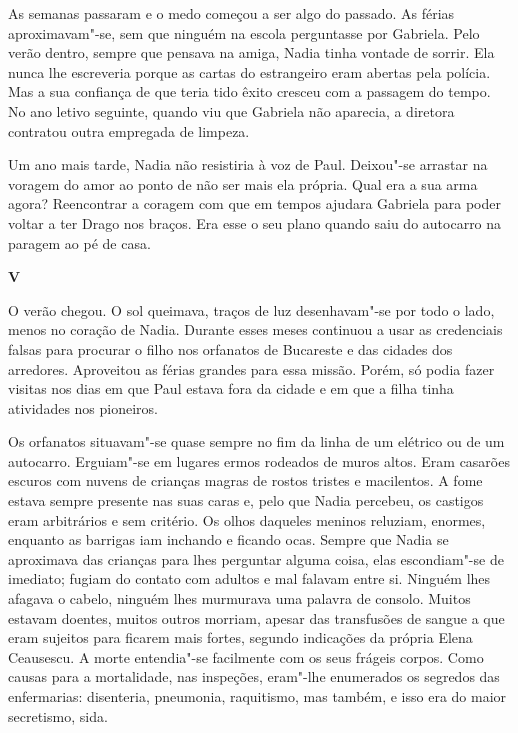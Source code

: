 As semanas passaram e o medo começou a ser algo do passado. As férias
aproximavam"-se, sem que ninguém na escola perguntasse por Gabriela. Pelo
verão dentro, sempre que pensava na amiga, Nadia tinha vontade de
sorrir. Ela nunca lhe escreveria porque as cartas do estrangeiro eram
abertas pela polícia. Mas a sua confiança de que teria tido êxito
cresceu com a passagem do tempo. No ano letivo seguinte, quando viu que
Gabriela não aparecia, a diretora contratou outra empregada de limpeza.

Um ano mais tarde, Nadia não resistiria à voz de Paul. Deixou"-se
arrastar na voragem do amor ao ponto de não ser mais ela própria. Qual
era a sua arma agora? Reencontrar a coragem com que em tempos ajudara
Gabriela para poder voltar a ter Drago nos braços. Era esse o seu plano
quando saiu do autocarro na paragem ao pé de casa.


\pagebreak
\thispagestyle{empty}
\movetooddpage
\vspace*{1.8cm}
\noindent{}\textbf{V}

\bigskip

\noindent{}O verão chegou. O sol queimava, traços de luz desenhavam"-se por todo o
lado, menos no coração de Nadia. Durante esses meses continuou a usar as
credenciais falsas para procurar o filho nos orfanatos de Bucareste e
das cidades dos arredores. Aproveitou as férias grandes para essa
missão. Porém, só podia fazer visitas nos dias em que Paul estava fora
da cidade e em que a filha tinha atividades nos pioneiros.

Os orfanatos situavam"-se quase sempre no fim da linha de um elétrico ou
de um autocarro. Erguiam"-se em lugares ermos rodeados de muros altos.
Eram casarões escuros com nuvens de crianças magras de rostos tristes e
macilentos. A fome estava sempre presente nas suas caras e, pelo que
Nadia percebeu, os castigos eram arbitrários e sem critério. Os olhos
daqueles meninos reluziam, enormes, enquanto as barrigas iam inchando e
ficando ocas. Sempre que Nadia se aproximava das crianças para lhes
perguntar alguma coisa, elas escondiam"-se de imediato; fugiam do
contato com adultos e mal falavam entre si. Ninguém lhes afagava o
cabelo, ninguém lhes murmurava uma palavra
de consolo. Muitos estavam doentes, muitos outros morriam, apesar das
transfusões de sangue a que eram sujeitos para ficarem mais fortes,
segundo indicações da própria Elena Ceausescu. A morte entendia"-se
facilmente com os seus frágeis corpos. Como causas para a mortalidade,
nas inspeções, eram"-lhe enumerados os segredos das enfermarias:
disenteria, pneumonia, raquitismo, mas também, e isso era do maior
secretismo, sida.


